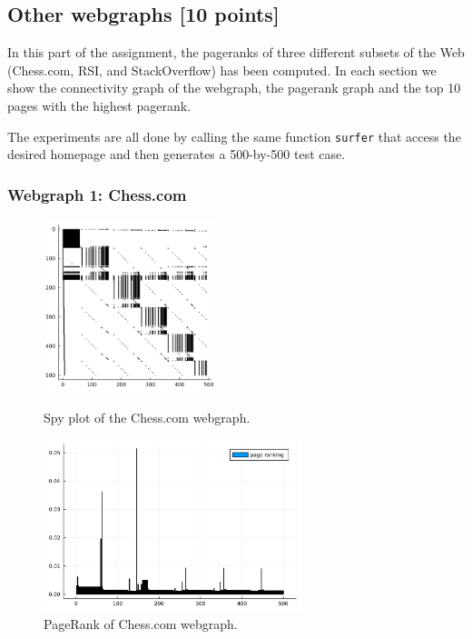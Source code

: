 \documentclass[unicode,11pt,a4paper,oneside,numbers=endperiod,openany]{scrartcl}
\begin{document}
\newpage
\subsection{Other webgraphs [10 points]}
In this part of the assignment, the pageranks of three different subsets of the Web (Chess.com, RSI, and StackOverflow) has been computed.
In each section we show the connectivity graph of the webgraph, the pagerank graph and the top 10 pages with the highest pagerank.

The experiments are all done by calling the same function \texttt{surfer} that access the desired homepage and then generates a 500-by-500 test case.


\subsubsection{Webgraph 1: Chess.com}
\begin{figure}[h!]
    \begin{minipage}{0.5\textwidth}
        \centering
        \includegraphics[height=5cm]{fig/chess.jpg}
        \caption{Spy plot of the Chess.com webgraph.}
        \label{fig:chesscom}
    \end{minipage}
    \begin{minipage}{0.5\textwidth}
        \centering
        \includegraphics[height=5cm]{fig/chess_pagerank.jpg}
        \caption{PageRank of Chess.com webgraph.}
        \label{fig:chesscom_pagerank}
    \end{minipage}
\end{figure}
\end{document}
